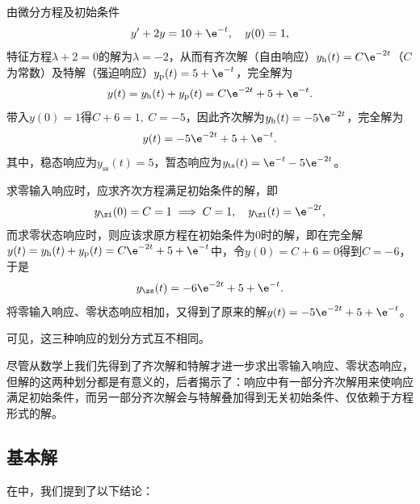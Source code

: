 \begin{example}[三种响应划分方式的区别]
    由微分方程及初始条件
    \begin{equation}
        y'+2y=10+\e^{-t},\quad y(0)=1,
    \end{equation}
    特征方程$\lambda+2=0$的解为$\lambda=-2$，从而有齐次解（自由响应）$y_{\text{h}}(t)=C\e^{-2t}$（$C$为常数）及特解（强迫响应）$y_{\text{p}}(t)=5+\e^{-t}$，完全解为
    \begin{equation}
        y(t)=y_{\text{h}}(t)+y_{\text{p}}(t)=C\e^{-2t}+5+\e^{-t}.
    \end{equation}
    带入$y(0)=1$得$C+6=1,\ C=-5$，因此齐次解为$y_{\text{h}}(t)=-5\e^{-2t}$，完全解为
    \begin{equation}
        y(t)=-5\e^{-2t}+5+\e^{-t}.
    \end{equation}
    其中，稳态响应为$y_{\text{ss}}(t)=5$，暂态响应为$y_{\text{ts}}(t)=\e^{-t}-5\e^{-2t}$。

    求零输入响应时，应求齐次方程满足初始条件的解，即
    \begin{equation}
        y_{\zi}(0)=C=1\implies C=1,\quad y_{\zi}(t)=\e^{-2t},
    \end{equation}
    而求零状态响应时，则应该求原方程在初始条件为$0$时的解，即在完全解$y(t)=y_{\text{h}}(t)+y_{\text{p}}(t)=C\e^{-2t}+5+\e^{-t}$中，令$y(0)=C+6=0$得到$C=-6$，于是
    \begin{equation}
        y_{\zs}(t)=-6\e^{-2t}+5+\e^{-t}.
    \end{equation}
    将零输入响应、零状态响应相加，又得到了原来的解$y(t)=-5\e^{-2t}+5+\e^{-t}$。

    可见，这三种响应的划分方式互不相同。
\end{example}
尽管从数学上我们先得到了齐次解和特解才进一步求出零输入响应、零状态响应，但解的这两种划分都是有意义的，后者揭示了：响应中有一部分齐次解用来使响应满足初始条件，而另一部分齐次解会与特解叠加得到无关初始条件、仅依赖于方程形式的解。

\subsection{基本解}\label{sub:fundamental_solution}

在中，我们提到了以下结论：

